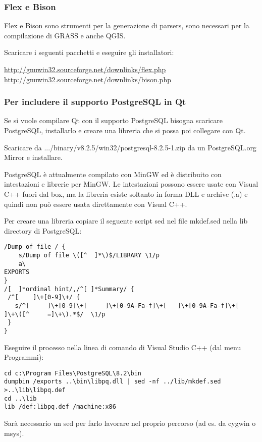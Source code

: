 \subsubsection{Flex e Bison}
Flex e Bison sono strumenti per la generazione di parsers, sono necessari per la compilazione di GRASS e anche QGIS.

Scaricare i seguenti pacchetti e eseguire gli installatori:

\url{http://gnuwin32.sourceforge.net/downlinks/flex.php} \\
\url{http://gnuwin32.sourceforge.net/downlinks/bison.php}

\subsubsection{Per includere il supporto PostgreSQL in Qt}
Se si vuole compilare Qt con il supporto PostgreSQL bisogna scaricare PostgreSQL, installarlo e creare una libreria che si possa poi collegare con Qt.

Scaricare da .../binary/v8.2.5/win32/postgresql-8.2.5-1.zip da un
PostgreSQL.org Mirror e installare.

PostgreSQL è attualmente compilato con MinGW ed è distribuito con intestazioni e librerie per MinGW. Le intestazioni possono essere usate con Visual C++ fuori dal box, ma la libreria esiste soltanto in forma DLL e archive (.a) e quindi non può essere usata direttamente con Visual C++.

Per creare una libreria copiare il seguente script sed nel file mkdef.sed nella lib directory di PostgreSQL:

\begin{verbatim}
/Dump of file / {
	s/Dump of file \([^	 ]*\)$/LIBRARY \1/p
	a\
EXPORTS
}
/[ 	]*ordinal hint/,/^[	]*Summary/ {
 /^[ 	]\+[0-9]\+/ {
   s/^[ 	]\+[0-9]\+[ 	]\+[0-9A-Fa-f]\+[ 	]\+[0-9A-Fa-f]\+[ 	]\+\([^ 	=]\+\).*$/	\1/p
 }
}
\end{verbatim}

Eseguire il processo nella linea di comando di Visual Studio C++ (dal menu Programmi):

\begin{verbatim}
cd c:\Program Files\PostgreSQL\8.2\bin
dumpbin /exports ..\bin\libpq.dll | sed -nf ../lib/mkdef.sed >..\lib\libpq.def
cd ..\lib
lib /def:libpq.def /machine:x86
\end{verbatim}

Sarà necessario un sed per farlo lavorare nel proprio percorso (ad es. da cygwin o msys).

